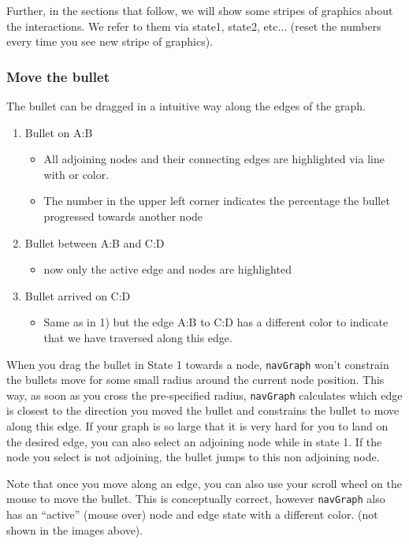 \documentclass[12pt,oneside,titlepage,letter]{article}
\newcommand{\modify}[1]{{\color{blue}#1}}
\begin{document}
Further, in the sections that follow, we will show some stripes of graphics about the interactions. We refer to them via state1, state2, etc... (reset the numbers every time you see new stripe of graphics).


\subsubsection{Move the bullet}
The bullet can be dragged in a intuitive way along the edges of the graph.
{\fontsize{11pt}{20pt}
 
}

\begin{enumerate}
\item Bullet on A:B
  \begin{itemize}
  \item All adjoining nodes and their connecting edges are highlighted via line with or color.
  \item The number in the upper left corner indicates the percentage the bullet progressed towards another node
  \end{itemize}
\item Bullet between A:B and C:D
  \begin{itemize}
  \item now only the active edge and nodes are highlighted
  \end{itemize}
\item Bullet arrived on C:D
  \begin{itemize}
  \item Same as in 1) but the edge A:B to C:D has a different color to indicate that we have traversed along this edge.
  \end{itemize}
\end{enumerate}

When you drag the bullet in State 1 towards a node, \texttt{navGraph} won't constrain the bullets move for some small radius around the current node position. This way, as soon as you cross the pre-specified radius, \texttt{navGraph} calculates which edge is closest to the direction you moved the bullet and constrains the bullet to move along this edge. If your graph is so large that it is very hard for you to land on the desired edge, you can also select an adjoining node while in state 1. If the node you select is not adjoining, the bullet jumps to this non adjoining node.

{\fontsize{11pt}{20pt}
 
}

Note that once you move along an edge, you can also use your scroll wheel on the mouse to move the bullet. \modify{This is conceptually correct, however \texttt{navGraph} also has an ``active'' (mouse over) node and edge state with a different color. (not shown in the images above).}
\end{document}
